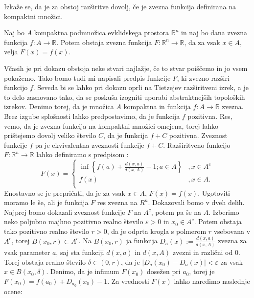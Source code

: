 \documentclass[mat1]{fmfdelo}
\newcommand{\R}{\mathbb R}
\newcommand{\0}{\underline{0}}
\begin{document}
Izkaže se, da je za obstoj razširitve dovolj, če je zvezna funkcija definirana na kompaktni množici.

\begin{lema}\label{lem:razsiritev}
Naj bo $A$ kompaktna podmnožica evklidskega prostora $\R^n$ in naj bo dana zvezna funkcija $f : A \to \R$. Potem obstaja zvezna funkcija $F : \R^n \to \R$, da za vsak $x \in A$, velja $F(x) = f(x)$.
\end{lema}

\begin{dokaz}
Včasih je pri dokazu obstoja neke stvari najlažje, če to stvar poiščemo in jo vsem pokažemo. Tako bomo tudi mi napisali predpis funkcije $F$, ki zvezno razširi funkcijo $f$. Seveda bi se lahko pri dokazu oprli na Tietzejev razširitveni izrek, a je to delo zasnovano tako, da se poskuša izogniti uporabi abstraktnejših topoloških izrekov. Denimo torej, da je množica $A$ kompaktna in funkcija \mbox{$f : A \to \R$} zvezna. Brez izgube splošnosti lahko predpostavimo, da je funkcija $f$ pozitivna. Res, vemo, da je zvezna funkcija na kompaktni množici omejena, torej lahko prištejemo dovolj veliko število $C$, da je funkcija $f + C$ pozitivna. Zveznost funkcije $f$ pa je ekvivalentna zveznosti funkcije $f + C$.
Razširitveno funkcijo \mbox{$F : \R^n \to \R$} lahko definiramo s predpisom :
\[  F(x) = \left \{
\begin{array}{ll}
	\inf \left \{ f(a) + \frac{d(x, a)}{d(x, A)} - 1; a \in A \right \} &, x \in A^c \\
	f(x) &, x \in A. \\
\end{array} 
\right. \]
Enostavno se je prepričati, da je za vsak $x \in A$, $F(x) = f(x)$. Ugotoviti moramo le še, ali je funkcija $F$ res zvezna na $R^n$.
Dokazovali bomo v dveh delih. Najprej bomo dokazali zveznost funkcije $F$ na $A^c$, potem pa še na $A$.
Izberimo neko poljubno majhno pozitivno realno število $\varepsilon > 0$ in $x_0 \in A^c$. Potem obstaja tako pozitivno realno število $r>0$, da je odprta krogla s polmerom $r$ vsebovana v $A^c$, torej $B(x_0, r) \subset A^c$. Na $B(x_0, r)$ ja funkcija $D_a(x) := \frac{d(x, a)}{d(x, A)}$ zvezna za vsak parameter $a$, saj sta funkciji $d(x, a)$ in $d(x, A)$ zvezni in različni od $0$. Torej obstaja realno število $\delta \in (0, r)$, da je $|D_a(x_0) - D_a(x)| < \varepsilon$ za vsak $x \in B(x_0, \delta)$.
Denimo, da je infimum $F(x_0)$ dosežen pri $a_0$, torej je $F(x_0) = f(a_0) + D_{a_0}(x_0) - 1$. Za vrednosti $F(x)$ lahko naredimo naslednje ocene:

\end{dokaz}
\end{document}
